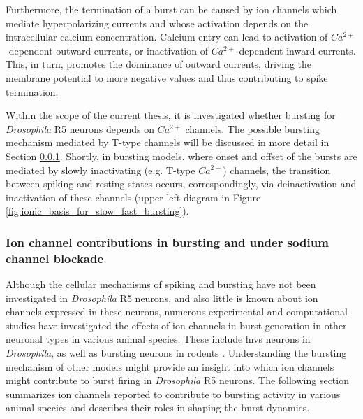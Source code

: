 \documentclass[../main.tex]{subfiles}
\begin{document}
Furthermore, the termination of a burst can be caused by ion channels which mediate hyperpolarizing currents and whose activation depends on the intracellular calcium concentration. Calcium entry can lead to activation of $Ca^{2+}$-dependent outward currents, or inactivation of $Ca^{2+}$-dependent inward currents. This, in turn, promotes the dominance of outward currents, driving the membrane potential to more negative values and thus contributing to spike termination.

Within the scope of the current thesis, it is investigated whether bursting for \textit{Drosophila} R5 neurons depends on $Ca^{2+}$ channels. The possible bursting mechanism mediated by T-type channels will be discussed in more detail in Section \ref{subsubsec:ion_channel_contributions}. Shortly, in bursting models, where onset and offset of the bursts are mediated by slowly inactivating (e.g. T-type $Ca^{2+}$) channels, the transition between spiking and resting states occurs, correspondingly, via deinactivation and inactivation of these channels (upper left diagram in Figure \ref{fig:ionic_basis_for_slow_fast_bursting}).


\subsubsection{Ion channel contributions in bursting and under sodium channel blockade} \label{subsubsec:ion_channel_contributions}

Although the cellular mechanisms of spiking and bursting have not been investigated in \textit{Drosophila} R5 neurons, and also little is known about ion channels expressed in these neurons, numerous experimental and computational studies have investigated the effects of ion channels in burst generation in other neuronal types in various animal species. These include \glspl{lnv} neurons in \textit{Drosophila}, as well as bursting neurons in rodents \parencite{vickstromTTypeCalciumChannels2020,golombContributionPersistentNa2006,liuMultipleConductancesCooperatively2008,wangMultipleDynamicalModes1994,mccormickModelElectrophysiologicalProperties1992}. Understanding the bursting mechanism of other models might provide an insight into which ion channels might contribute to burst firing in \textit{Drosophila} R5 neurons. The following section summarizes ion channels reported to contribute to bursting activity in various animal species and describes their roles in shaping the burst dynamics.
\end{document}
